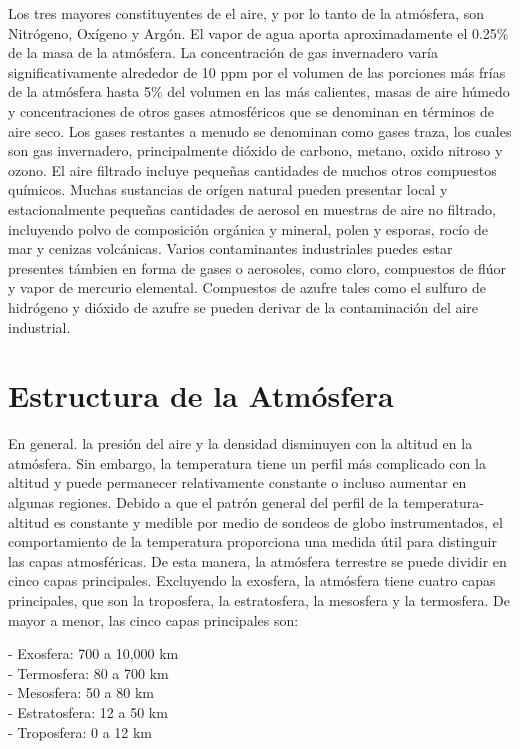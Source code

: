 \documentclass[12pt]{article}
\begin{document}
Los tres mayores constituyentes de el aire, y por lo tanto de la atmósfera, son Nitrógeno, Oxígeno y Argón. El vapor de agua aporta aproximadamente el 0.25\% de la masa de la atmósfera. La concentración de gas invernadero varía significativamente alrededor de 10 ppm por el volumen de las porciones más frías de la atmósfera hasta 5\% del volumen en las más calientes, masas de aire húmedo y concentraciones de otros gases atmosféricos que se denominan en términos de aire seco. Los gases restantes a menudo se denominan como gases traza, los cuales son gas invernadero, principalmente dióxido de carbono, metano, oxido nitroso y ozono. El aire filtrado incluye pequeñas cantidades de muchos otros compuestos químicos. Muchas sustancias de orígen natural pueden presentar local y estacionalmente pequeñas cantidades de aerosol en muestras de aire no filtrado, incluyendo polvo de composición orgánica y mineral, polen y esporas, rocío de mar y cenizas volcánicas. Varios contaminantes industriales puedes estar presentes támbien en forma de gases o aerosoles, como cloro, compuestos de flúor y vapor de mercurio elemental. Compuestos de azufre tales como el sulfuro de hidrógeno y dióxido de azufre se pueden derivar de la contaminación del aire industrial.


\section{Estructura de la Atmósfera}

En general. la presión del aire y la densidad disminuyen con la altitud en la atmósfera. Sin embargo, la temperatura tiene un perfil más complicado con la altitud y puede permanecer relativamente constante o incluso aumentar en algunas regiones. Debido a que el patrón general del perfil de la temperatura-altitud es constante y medible por medio de sondeos de globo instrumentados, el comportamiento de la temperatura proporciona una medida útil para distinguir las capas atmosféricas. De esta manera, la atmósfera terrestre se puede dividir en cinco capas principales. Excluyendo la exosfera, la atmósfera tiene cuatro capas principales, que son la troposfera, la estratosfera, la mesosfera y la termosfera. De mayor a menor, las cinco capas principales son:

- Exosfera: 700 a 10,000 km \\- Termosfera: 80 a 700 km \\- Mesosfera: 50 a 80 km \\- Estratosfera: 12 a 50 km\\- Troposfera: 0 a 12 km
\end{document}
